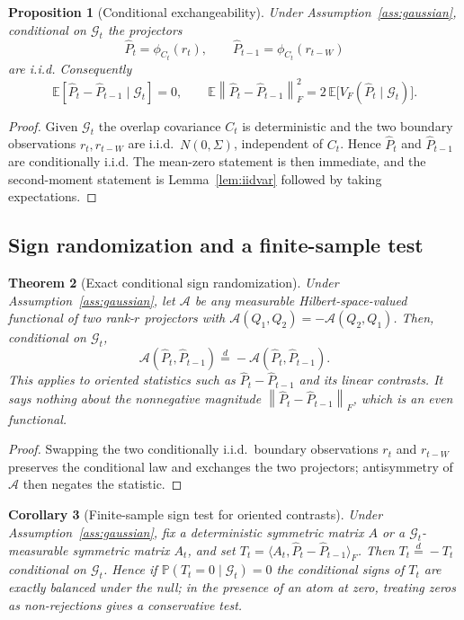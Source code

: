 \documentclass[11pt]{article}
\theoremstyle{tightplain}
\newtheorem{theorem}{Theorem}[section]
\newtheorem{proposition}[theorem]{Proposition}
\newtheorem{corollary}[theorem]{Corollary}
\theoremstyle{tightdef}
\newcommand{\E}{\mathbb E}
\newcommand{\Prob}{\mathbb P}
\newcommand{\norm}[1]{\left\lVert #1 \right\rVert}
\newcommand{\Phat}{\widehat P}
\newcommand{\Gcal}{\mathcal G}
\begin{document}
\begin{proposition}[Conditional exchangeability]\label{prop:exchangeability}
Under Assumption~\ref{ass:gaussian}, conditional on $\Gcal_t$ the projectors
\[
\Phat_t=\phi_{C_t}(r_t),
\qquad
\Phat_{t-1}=\phi_{C_t}(r_{t-W})
\]
are i.i.d. Consequently
\[
\E[\Phat_t-\Phat_{t-1}\mid\Gcal_t]=0,
\qquad
\E\norm{\Phat_t-\Phat_{t-1}}_F^2=2\,\E\bigl[V_F(\Phat_t\mid\Gcal_t)\bigr].
\]
\end{proposition}

\begin{proof}
Given $\Gcal_t$ the overlap covariance $C_t$ is deterministic and the two boundary
observations $r_t,r_{t-W}$ are i.i.d.\ $N(0,\Sigma)$, independent of $C_t$. Hence
$\Phat_t$ and $\Phat_{t-1}$ are conditionally i.i.d. The mean-zero statement is then
immediate, and the second-moment statement is Lemma~\ref{lem:iidvar} followed by
taking expectations.
\end{proof}

\subsection{Sign randomization and a finite-sample test}\label{sec:sign}

\begin{theorem}[Exact conditional sign randomization]\label{thm:exactrandomization}
Under Assumption~\ref{ass:gaussian}, let $\mathcal A$ be any measurable
Hilbert-space-valued functional of two rank-$r$ projectors with
$\mathcal A(Q_1,Q_2)=-\mathcal A(Q_2,Q_1)$. Then, conditional on $\Gcal_t$,
\[
\mathcal A(\Phat_t,\Phat_{t-1})\stackrel{d}=-\mathcal A(\Phat_t,\Phat_{t-1}).
\]
This applies to oriented statistics such as $\Phat_t-\Phat_{t-1}$ and its linear
contrasts. It says nothing about the nonnegative magnitude
$\norm{\Phat_t-\Phat_{t-1}}_F$, which is an even functional.
\end{theorem}

\begin{proof}
Swapping the two conditionally i.i.d.\ boundary observations $r_t$ and $r_{t-W}$
preserves the conditional law and exchanges the two projectors; antisymmetry of
$\mathcal A$ then negates the statistic.
\end{proof}

\begin{corollary}[Finite-sample sign test for oriented contrasts]\label{cor:signtest}
Under Assumption~\ref{ass:gaussian}, fix a deterministic symmetric matrix $A$ or a
$\Gcal_t$-measurable symmetric matrix $A_t$, and set
$T_t=\langle A_t,\Phat_t-\Phat_{t-1}\rangle_F$. Then $T_t\stackrel d=-T_t$
conditional on $\Gcal_t$. Hence if $\Prob(T_t=0\mid\Gcal_t)=0$ the conditional signs
of $T_t$ are exactly balanced under the null; in the presence of an atom at zero,
treating zeros as non-rejections gives a conservative test.
\end{corollary}
\end{document}
